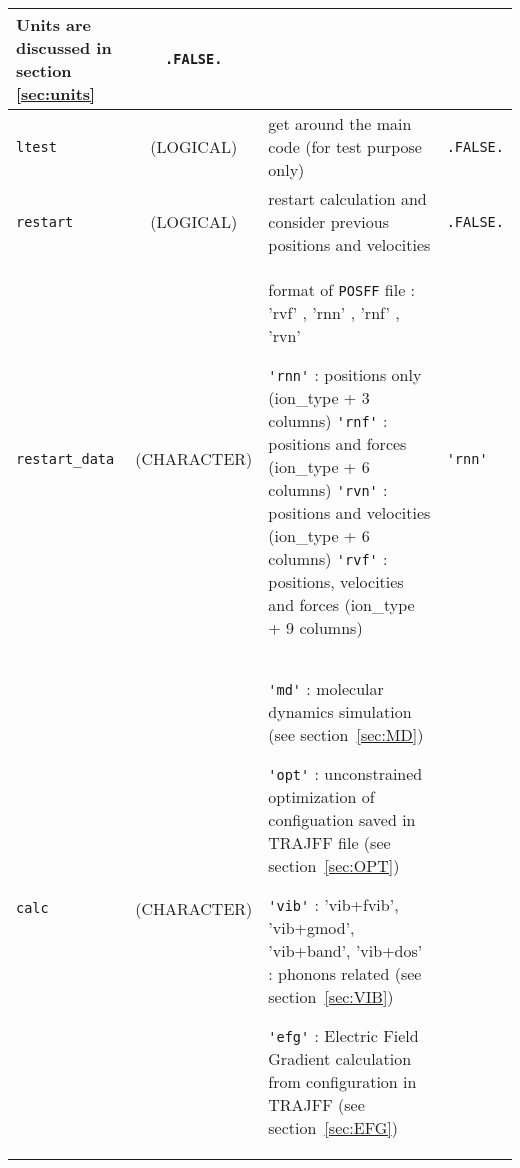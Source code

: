 \documentclass[a4paper]{article}
\begin{document}
\begin{longtable}{l|c|m{8cm}|m{2cm}}
					 Units are discussed in section \ref{sec:units} \newline                            & \verb?.FALSE.? \\ 
\hline
\rule[-0.75cm]{0cm}{1.5cm}
\verb?ltest?     & (LOGICAL)          &  get around the main code (for test purpose only)                                   & \verb?.FALSE.? \\
\hline
\rule[-0.75cm]{0cm}{1.5cm}
\verb?restart?   & (LOGICAL)          &  restart calculation and consider previous positions and velocities                 & \verb?.FALSE.? \\
\hline
\rule[-0.75cm]{0cm}{1.5cm}
\verb?restart_data?  
                 & (CHARACTER)        &  format of  \verb?POSFF? file : 'rvf' , 'rnn' , 'rnf' , 'rvn' \newline

                                         \verb?'rnn'? : positions only                   (ion\_type + 3 columns) \newline 
                                         \verb?'rnf'? : positions and forces             (ion\_type + 6 columns) \newline 
                                         \verb?'rvn'? : positions and velocities         (ion\_type + 6 columns) \newline 
                                         \verb?'rvf'? : positions, velocities and forces (ion\_type + 9 columns) 

                                                                                                                            & \verb?'rnn'? \tabularnewline
\hline
\rule[-2.5cm]{0cm}{5cm}
\verb?calc?      & (CHARACTER)        & \newline \verb?'md'?  : molecular dynamics simulation (see section~\ref{sec:MD}) \newline

                                        \verb?'opt'? : unconstrained optimization of configuation saved in TRAJFF file 
					(see section~\ref{sec:OPT}) \newline

					\verb?'vib'? : 'vib+fvib', 'vib+gmod', 'vib+band', 'vib+dos' : phonons related 
					(see section~\ref{sec:VIB})\newline

					\verb?'efg'? : Electric Field Gradient calculation from configuration in TRAJFF 
					(see section~\ref{sec:EFG})\newline


\end{longtable}
\end{document}
